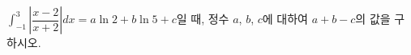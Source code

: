 \hspace*{2mm}\begin{minipage}[t]{\dimexpr\linewidth-2mm\relax}\vspace{0pt}
$\displaystyle\int_{-1}^{3}\left|\dfrac{x-2}{x+2}\right|dx=a\ln 2+b\ln 5+c$일 때, 정수 $a$, $b$, $c$에 대하여 $a+b-c$의 값을 구하시오.\end{minipage}
